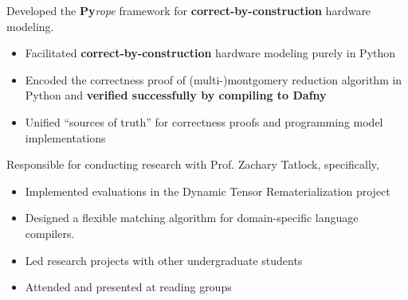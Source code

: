 \documentclass{resume}
\begin{document}
Developed the \textbf{Py}\textit{rope} framework for \textbf{correct-by-construction} hardware modeling.
\begin{itemize}
  \item Facilitated \textbf{correct-by-construction} hardware modeling purely in Python
  \item Encoded the correctness proof of (multi-)montgomery reduction algorithm in Python and \textbf{verified successfully by compiling to Dafny}
  \item Unified ``sources of truth'' for correctness proofs and programming model implementations
\end{itemize}

Responsible for conducting research with Prof. Zachary Tatlock, specifically,
\begin{itemize}
    \item Implemented evaluations in the Dynamic Tensor Rematerialization project
    \item Designed a flexible matching algorithm for domain-specific language compilers.
    \item Led research projects with other undergraduate students
    \item Attended and presented at reading groups
\end{itemize}
\end{document}
